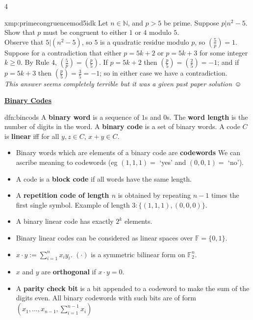 \documentclass[landscape, 8pt]{extarticle}
\begin{document}
\begin{multicols*}{4}
		
		\begin{xmp}{xmp:primecongruencemod5idk}{ }
			Let $n \in \mathbb{N}$, and $p>5$ be prime. Suppose $p|n^2 -5$. Show that $p$ must be congruent to either $1$ or $4$ modulo $5$.\\
			Observe that $5|(n^2 - 5)$, so $5$ is a quadratic residue modulo $p$, so $(\frac{5}{p}) = 1$. Suppose for a contradiction that either $p=5k+2$ or $p=5k+3$ for some integer $k \ge 0$. By Rule 4, $(\frac{5}{p}) = (\frac{p}{5})$. If $p = 5k+2$ then $(\frac{p}{5}) = (\frac{2}{5}) = -1$; and if $p = 5k+3$ then $(\frac{p}{5}) = \frac{3}{5} = -1$; so in either case we have a contradiction.\\
			\textit{This answer seems completely terrible but it was a given past paper solution $\smiley$}
			
		\end{xmp}
		
		
		
		\columnbreak
		
		
		{\footnotesize \textbf{\underline{Binary Codes}}}
		
		
		
		\begin{mdfn}{dfn:bincods}{ }
		A \textbf{binary word} is a sequence of $1$s and $0$s. The \textbf{word length} is the number of digits in the word. A \textbf{binary code} is a set of binary words. A code $C$ is \textbf{linear} iff for all $y, z\in C$, $x+y\in C$.
		\begin{itemize}
			\item Binary words which are elements of a binary code are \textbf{codewords} We can ascribe meaning to codewords (eg $(1, 1, 1) =$ `yes' and $(0, 0, 1) =$ `no').
			\item A code is a \textbf{block code} if all words have the same length.
			\item A \textbf{repetition code of length $n$} is obtained by repeating $n-1$ times the first single symbol. Example of length $3: \{(1, 1, 1), (0, 0, 0)\}$.
			\item A binary linear code has exactly $2^k$ elements.
			\item Binary linear codes can be considered as linear spaces over $\mathbb{F} = \{0, 1\}$.
			\item $x \cdot y := \sum_{i=1}^{n}x_i y_i$. $(\cdot)$ is a symmetric bilinear form on $\mathbb{F}_2^n$.
			\item $x$ and $y$ are \textbf{orthogonal} if $x \cdot y = 0$.
			\item A \textbf{parity check bit} is a bit appended to a codeword to make the sum of the digits even. All binary codewords with such bits are of form $(x_1, \dots, x_{n-1}, \sum_{i=1}^{n-1}x_i)$
		\end{itemize}
		

\end{mdfn}
\end{multicols*}
\end{document}
